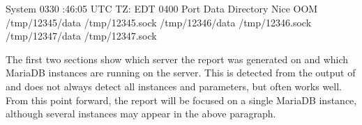 \documentclass[letterpaper,10pt,english]{sphinxmanual}
\begin{document}
\begin{sphinxVerbatim}[commandchars=\\\{\}]
              System   \PYGZhy{}03\PYGZhy{}30 :46:05 UTC
                             TZ: EDT \PYGZhy{}0400
  Port  Data Directory             Nice OOM 
      
   /tmp/12345/data                   /tmp/12345.sock
   /tmp/12346/data                   /tmp/12346.sock
   /tmp/12347/data                   /tmp/12347.sock
\end{sphinxVerbatim}

\sphinxAtStartPar
The first two sections show which server the report was generated on and which
MariaDB instances are running on the server. This is detected from the output of
 and does not always detect all instances and parameters, but often works
well.  From this point forward, the report will be focused on a single MariaDB
instance, although several instances may appear in the above paragraph.
\end{document}
